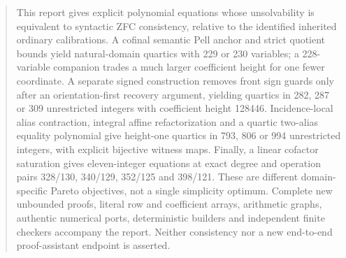 \begin{abstract}
This report gives explicit polynomial equations whose unsolvability is equivalent to syntactic ZFC consistency, relative to the identified inherited ordinary calibrations. A cofinal semantic Pell anchor and strict quotient bounds yield natural-domain quartics with 229 or 230 variables; a 228-variable companion trades a much larger coefficient height for one fewer coordinate. A separate signed construction removes front sign guards only after an orientation-first recovery argument, yielding quartics in 282, 287 or 309 unrestricted integers with coefficient height 128446. Incidence-local alias contraction, integral affine refactorization and a quartic two-alias equality polynomial give height-one quartics in 793, 806 or 994 unrestricted integers, with explicit bijective witness maps. Finally, a linear cofactor saturation gives eleven-integer equations at exact degree and operation pairs 328/130, 340/129, 352/125 and 398/121. These are different domain-specific Pareto objectives, not a single simplicity optimum. Complete new unbounded proofs, literal row and coefficient arrays, arithmetic graphs, authentic numerical ports, deterministic builders and independent finite checkers accompany the report. Neither consistency nor a new end-to-end proof-assistant endpoint is asserted.
\end{abstract}

